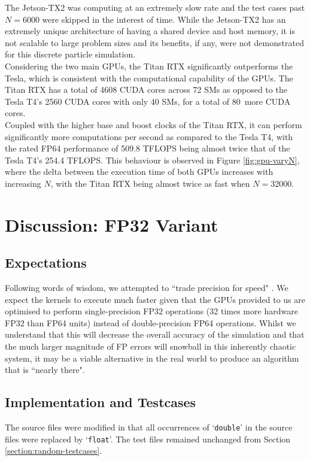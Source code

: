 \documentclass[12pt]{article}
\begin{document}
The Jetson-TX2 was computing at an extremely slow rate and the test cases past $N = 6000$ were skipped in the interest of time. While the Jetson-TX2 has an extremely unique architecture of having a shared device and host memory, it is not scalable to large problem sizes and its benefits, if any, were not demonstrated for this discrete particle simulation. \\

Considering the two main GPUs, the Titan RTX significantly outperforms the Tesla, which is consistent with the computational capability of the GPUs. The Titan RTX has a total of 4608 CUDA cores across 72 SMs as opposed to the Tesla T4's 2560 CUDA cores with only 40 SMs, for a total of 80\ more CUDA cores.\\

Coupled with the higher base and boost clocks of the Titan RTX, it can perform significantly more computations per second as compared to the Tesla T4, with the rated FP64 performance of 509.8 TFLOPS being almost twice that of the Tesla T4's 254.4 TFLOPS. This behaviour is observed in Figure \ref{fig:gpu-varyN}, where the delta between the execution time of both GPUs increases with increasing $N$, with the Titan RTX being almost twice as fast when $N = 32000$.

\pagebreak

\section{Discussion: FP32 Variant}

\subsection{Expectations}
Following words of wisdom, we attempted to ``trade precision for speed" \cite{precisionforspeed}. We expect the kernels to execute much faster given that the GPUs provided to us are optimised to perform single-precision FP32 operations (32 times more hardware FP32 than FP64 units) instead of double-precision FP64 operations. Whilst we understand that this will decrease the overall accuracy of the simulation and that the much larger magnitude of FP errors will snowball in this inherently chaotic system, it may be a viable alternative in the real world to produce an algorithm that is ``nearly there".

\subsection{Implementation and Testcases}
The source files were modified in that all occurrences of `\texttt{double}' in the source files were replaced by `\texttt{float}'. The test files remained unchanged from Section \ref{section:random-testcases}.
\end{document}
